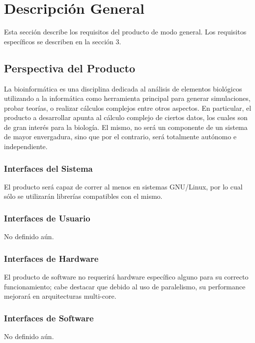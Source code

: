 \documentclass[10pt,a4paper,english,spanish]{article}
\begin{document}
\section{Descripción General}
\label{section-desc-gral}
Esta sección describe los requisitos del producto de modo general. Los
requisitos específicos se describen en la sección 3.

\subsection{Perspectiva del Producto}
La bioinformática es una disciplina dedicada al análisis de elementos biológicos utilizando a la informática como herramienta principal para generar simulaciones, probar teorías, o realizar cálculos complejos entre otros aspectos. En particular, el producto a desarrollar apunta al cálculo complejo de ciertos datos, los cuales son de gran interés para la biología. El mismo, no será un componente de un sistema de mayor envergadura, sino que por el contrario, será totalmente autónomo e independiente. 

	\subsubsection{Interfaces del Sistema}
		El producto será capaz de correr al menos en sistemas GNU/Linux, por lo cual sólo se utilizarán librerías 			compatibles con el mismo.

	\subsubsection{Interfaces de Usuario}		
		No definido aún.		

	\subsubsection{Interfaces de Hardware}
		El producto de software no requerirá hardware específico alguno para su correcto funcionamiento; cabe destacar 			que debido al uso de paralelismo, su performance mejorará en arquitecturas multi-core.

	\subsubsection{Interfaces de Software}
		No definido aún.
\end{document}
